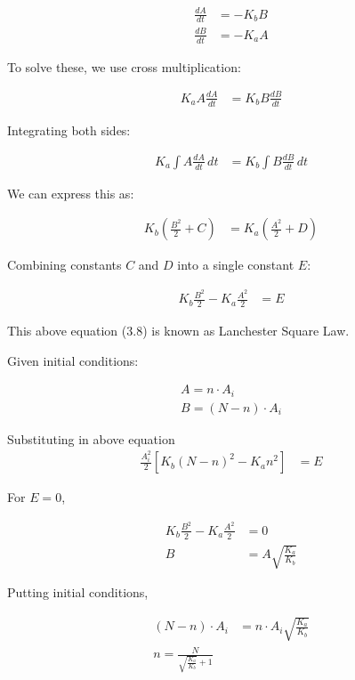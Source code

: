 \documentclass[oneside,12pt]{report}
\begin{document}
\begin{align}
    \frac{d A}{dt} &= -K_b B \\
    \frac{d B}{dt} &= -K_a A
\end{align}

To solve these, we use cross multiplication:

\begin{align}
    K_a A \frac{d A}{dt} &= K_b B \frac{d B}{dt}
\end{align}

Integrating both sides:

\begin{align}
    K_a \int A \frac{d A}{dt} \, dt &= K_b \int B \frac{d B}{dt} \, dt
\end{align}

We can express this as:

\begin{align}
    K_b \left( \frac{B^2}{2} + C \right) &= K_a \left( \frac{A^2}{2} + D \right)
\end{align}

Combining constants $C$ and $D$ into a single constant $E$:

\begin{align}
    K_b \frac{B^2}{2} - K_a \frac{A^2}{2} &= E
\end{align}

This above equation (3.8) is known as Lanchester Square Law.

Given initial conditions:

\begin{align}
    A = n \cdot A_i \\
    B = (N - n) \cdot A_i
\end{align}

Substituting in above equation
\begin{align}
    \frac{A_i^2}{2} \left[ K_b (N - n)^2 - K_a n^2 \right] &= E
\end{align}

For \(E = 0\),

\begin{align}
    K_b \frac{B^2}{2} - K_a \frac{A^2}{2} &= 0 \\
    B &= A \sqrt{\frac{K_a}{K_b}}
\end{align}

Putting initial conditions,

\begin{align}
    (N - n) \cdot A_i &= n \cdot A_i \sqrt{\frac{K_a}{K_b}} \\
    n = \frac{N} {\sqrt{\frac{K_a}{K_b}} + 1} 
\end{align}
\end{document}
